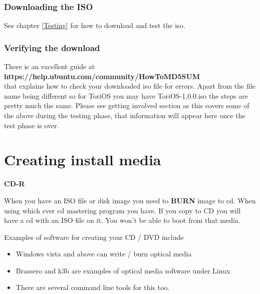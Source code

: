 \documentclass[12pt,a4paper]{book}
\begin{document}
\subsection{Downloading the ISO}

See chapter \ref{Testing} for how to download and test the iso. 



\subsection{Verifying the download}
There is an excellent guide at\\ \textbf{https://help.ubuntu.com/community/HowToMD5SUM} \\
that explains how to check your downloaded iso file for errors.  Apart from the file name being different so for ToriOS you may have ToriOS-1.0.0.iso the steps are pretty much the same.  
Please see getting involved section as this covers some of the above during the testing phase,  that information will appear here once the test phase is over. 
\chapter{Creating install media}


\newpage

\textbf{CD-R}

When you have an ISO file or disk image you need to \textbf{BURN} image to cd.  When using which ever cd mastering program you have.  If you copy to CD you will have a cd with an ISO file on it.  You won't be able to boot from that media.

Examples of software for creating your CD / DVD include

\begin{itemize}
\item Windows vista and above can write / burn optical media \cite{WindowsCD}
\item Brassero and k3b are examples of optical media software under Linux
\item There are several command line tools for this too.
\end{itemize}

\newpage
\end{document}
